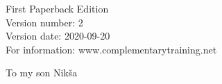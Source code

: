 {{    \vspace{10\baselineskip}
    First Paperback Edition\\
    Version number: 2\\
    Version date: 2020-09-20\\
    For information: www.complementarytraining.net
    }
    \clearpage
    \thispagestyle{empty}
    \strut
    \begin{center}
        To my son Nikša
    \end{center}
    \strut
}


\usepackage{fancyhdr}
\usepackage{truncate}
\renewcommand{\headrulewidth}{0pt}
\renewcommand{\footrulewidth}{0pt}
\pagestyle{main}

\usepackage[htt]{hyphenat}
